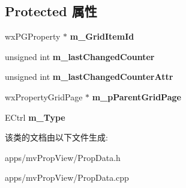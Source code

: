\subsection*{Protected 属性}
\begin{DoxyCompactItemize}
\item 
\hypertarget{class_prop_data_ac51d6c0e4da861541c39ae16c6102bf4}{wx\+P\+G\+Property $\ast$ {\bfseries m\+\_\+\+Grid\+Item\+Id}}\label{class_prop_data_ac51d6c0e4da861541c39ae16c6102bf4}

\item 
\hypertarget{class_prop_data_ad660e3b394496b50a2cc853600f1bda2}{unsigned int {\bfseries m\+\_\+last\+Changed\+Counter}}\label{class_prop_data_ad660e3b394496b50a2cc853600f1bda2}

\item 
\hypertarget{class_prop_data_a75850cb842485a8d5f89b73638fd8b8e}{unsigned int {\bfseries m\+\_\+last\+Changed\+Counter\+Attr}}\label{class_prop_data_a75850cb842485a8d5f89b73638fd8b8e}

\item 
\hypertarget{class_prop_data_aa7e694264a8e3b05c765e70a02a9ffed}{wx\+Property\+Grid\+Page $\ast$ {\bfseries m\+\_\+p\+Parent\+Grid\+Page}}\label{class_prop_data_aa7e694264a8e3b05c765e70a02a9ffed}

\item 
\hypertarget{class_prop_data_a00cc045a18c00f2a4f30330fc699e99f}{E\+Ctrl {\bfseries m\+\_\+\+Type}}\label{class_prop_data_a00cc045a18c00f2a4f30330fc699e99f}

\end{DoxyCompactItemize}


该类的文档由以下文件生成\+:\begin{DoxyCompactItemize}
\item 
apps/mv\+Prop\+View/Prop\+Data.\+h\item 
apps/mv\+Prop\+View/Prop\+Data.\+cpp\end{DoxyCompactItemize}
